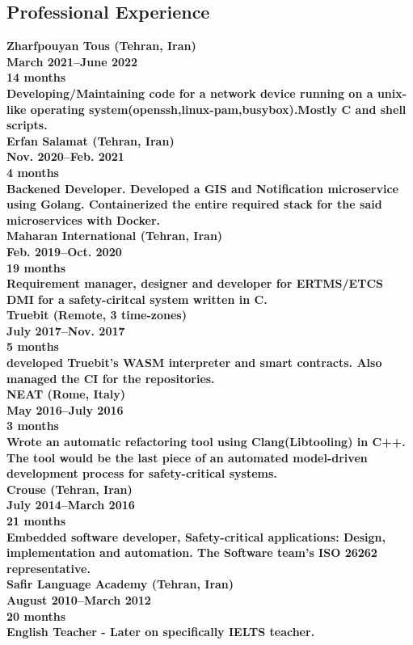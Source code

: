 \documentclass[8pt]{article}
\begin{document}
\begin{multicols}{2}
  \section*{Professional Experience}
  \bf Zharfpouyan Tous (Tehran, Iran)\\
  March 2021--June 2022\\
  14 months\\
  \normalfont Developing/Maintaining code for a network device running on a unix-like operating system(openssh,linux-pam,busybox).Mostly C and shell scripts.\\[5pt]
  \bf Erfan Salamat (Tehran, Iran)\\
  Nov. 2020--Feb. 2021\\
  4 months\\
  \normalfont Backened Developer. Developed a GIS and Notification microservice using Golang. Containerized the entire required stack for the said microservices with Docker.\\[5pt]
  \bf Maharan International (Tehran, Iran)\\
  Feb. 2019--Oct. 2020\\
  19 months\\
  \normalfont Requirement manager, designer and developer for ERTMS/ETCS DMI for a safety-ciritcal system written in C.\\[5pt]
  \bf Truebit (Remote, 3 time-zones)\\
  July 2017--Nov. 2017\\
  5 months\\
  \normalfont developed Truebit's WASM interpreter and smart contracts. Also managed the CI for the repositories.\\[5pt]
  \bf NEAT (Rome, Italy)\\
  May 2016--July 2016\\
  3 months\\
  \normalfont Wrote an automatic refactoring tool using Clang(Libtooling) in C++. The tool would be the last piece of an automated model-driven development process for safety-critical systems.\\[5pt]
  \bf Crouse (Tehran, Iran)\\
  July 2014--March 2016\\
  21 months\\
  \normalfont Embedded software developer, Safety-critical applications: Design, implementation and automation. The Software team’s ISO 26262 representative.\\[5pt]
  \bf Safir Language Academy (Tehran, Iran)\\
  August 2010--March 2012\\
  20 months\\
  \normalfont English Teacher - Later on specifically IELTS teacher.\\[5pt]


\end{multicols}
\end{document}

